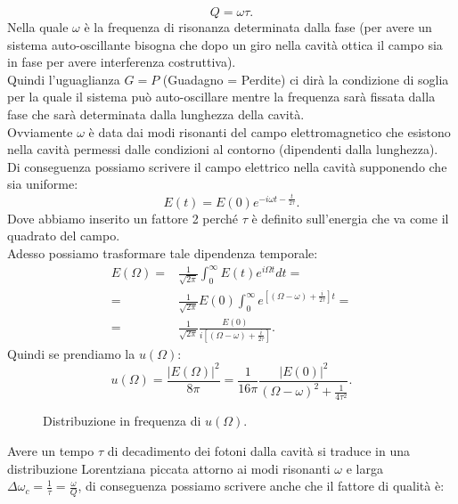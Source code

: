 \[
Q = \omega\tau
.\] 
Nella quale $\omega$ è la frequenza di risonanza determinata dalla fase (per avere un sistema auto-oscillante bisogna che dopo un giro nella cavità ottica il campo sia in fase per avere interferenza costruttiva). \\
Quindi l'uguaglianza $G=P$ (Guadagno = Perdite) ci dirà la condizione di soglia per la quale il sistema può auto-oscillare mentre la frequenza sarà fissata dalla fase che sarà determinata dalla lunghezza della cavità.\\
Ovviamente $\omega$ è data dai modi risonanti del campo elettromagnetico che esistono nella cavità permessi dalle condizioni al contorno (dipendenti dalla lunghezza).\\
Di conseguenza possiamo scrivere il campo elettrico nella cavità supponendo che sia uniforme:
\[
    E(t) = E(0) e^{-i\omega t- \frac{t}{2\tau}}
.\] 
Dove abbiamo inserito un fattore 2 perché $\tau$ è definito sull'energia che va come il quadrato del campo.\\
Adesso possiamo trasformare tale dipendenza temporale:
\[\begin{aligned}
    E(\Omega) =& \frac{1}{\sqrt{2\pi} }\int_{0}^{\infty} E(t) e^{i\Omega t}dt=\\
    =&
    \frac{1}{\sqrt{2\pi}}E(0)\int_{0}^{\infty} 
    e^{\left[\left(\Omega -\omega\right)+ \frac{i}{2\tau}\right]t}=\\
    =&
    \frac{1}{\sqrt{2\pi}}
    \frac{E(0)}{i\left[\left(\Omega-\omega\right)+\frac{i}{2\tau}\right]}
.\end{aligned}\]
Quindi se prendiamo la $u(\Omega)$:
\[
    u(\Omega) = \frac{\left|E(\Omega)\right|^2}{8\pi} = \frac{1}{16\pi} 
    \frac{\left|E(0)\right|^2}{\left(\Omega-\omega\right)^2+ \frac{1}{4\tau^2}}
.\] 
\begin{figure}[H]
    \centering
    \caption{Distribuzione in frequenza di $u(\Omega)$.}
    \label{Lorentziana}
\end{figure}
Avere un tempo $\tau$ di decadimento dei fotoni dalla cavità si traduce in una distribuzione Lorentziana piccata attorno ai modi risonanti $\omega$ e larga $\Delta\omega_c = \frac{1}{\tau}=\frac{\omega}{Q}$, di conseguenza possiamo scrivere anche che il fattore di qualità è:
